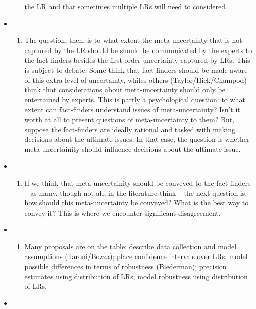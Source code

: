 \documentclass[
  10pt,
  dvipsnames,enabledeprecatedfontcommands]{scrartcl}
\providecommand{\tightlist}{%
  \setlength{\itemsep}{0pt}\setlength{\parskip}{0pt}}
\begin{document}
\begin{itemize}
\begin{enumerate}
    the LR and that sometimes multiple LRs will need to considered.
  \end{enumerate}
\item
  \begin{enumerate}
  \def\labelenumi{(\roman{enumi})}
  \setcounter{enumi}{1}
  \tightlist
  \item
    The question, then, is to what extent the meta-uncertainty that is
    not captured by the LR should be should be communicated by the
    experts to the fact-finders besides the first-order uncertainty
    captured by LRs. This is subject to debate. Some think that
    fact-finders should be made aware of this extra level of
    uncertainty, whiles others (Taylor/Hick/Champod) think that
    considerations about meta-uncertainty should only be entertained by
    experts. This is partly a psychological question: to what extent can
    fact-finders understand issues of meta-uncertainty? Isn't it worth
    at all to present questions of meta-uncertainty to them? But,
    suppose the fact-finders are ideally rational and tasked with making
    decisions about the ultimate issues. In that case, the question is
    whether meta-uncertainity should influence decisions about the
    ultimate issue.
  \end{enumerate}
\item
  \begin{enumerate}
  \def\labelenumi{(\roman{enumi})}
  \setcounter{enumi}{2}
  \tightlist
  \item
    If we think that meta-uncertainity should be conveyed to the
    fact-finders -- as many, though not all, in the literature think --
    the next question is, how should this meta-uncertainty be conveyed?
    What is the best way to convey it? This is where we encounter
    significant disagreement.
  \end{enumerate}
\item
  \begin{enumerate}
  \def\labelenumi{(\roman{enumi})}
  \setcounter{enumi}{3}
  \tightlist
  \item
    Many proposals are on the table: describe data collection and model
    assumptions (Taroni/Bozza); place confidence intervals over LRs;
    model possible differences in terms of robustness (Biederman);
    precision estimates using distribution of LRs; model robustness
    using distribution of LRs.
  \end{enumerate}
\item
  \begin{enumerate}

\end{enumerate}
\end{itemize}
\end{document}
